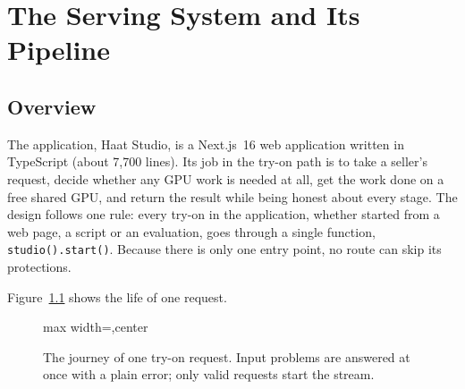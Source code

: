 \chapter{The Serving System and Its Pipeline}

\section{Overview}

The application, Haat Studio, is a Next.js~16 web application written in TypeScript (about 7{,}700 lines). Its job in the try-on path is to take a seller's request, decide whether any GPU work is needed at all, get the work done on a free shared GPU, and return the result while being honest about every stage. The design follows one rule: every try-on in the application, whether started from a web page, a script or an evaluation, goes through a single function, \texttt{studio().start()}. Because there is only one entry point, no route can skip its protections.

Figure~\ref{fig:journey} shows the life of one request.

\begin{figure}[!htbp]
\centering
\begin{adjustbox}{max width=\linewidth,center}
\end{adjustbox}
\caption{The journey of one try-on request. Input problems are answered at once with a plain error; only valid requests start the stream.}
\label{fig:journey}
\end{figure}

